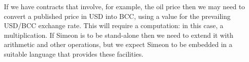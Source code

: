 \documentclass[runningheads]{llncs}
\begin{document}
If we have contracts that involve, for example, the oil price then we may need to convert a published price in USD into 
BCC, using a value for the prevailing USD/BCC exchange rate. This will require a computation: in this case, a 
multiplication. If Simeon is to be stand-alone then we need to extend it with arithmetic and other operations, but 
we expect Simeon to be embedded in a suitable language that provides these facilities.

%
\end{document}
